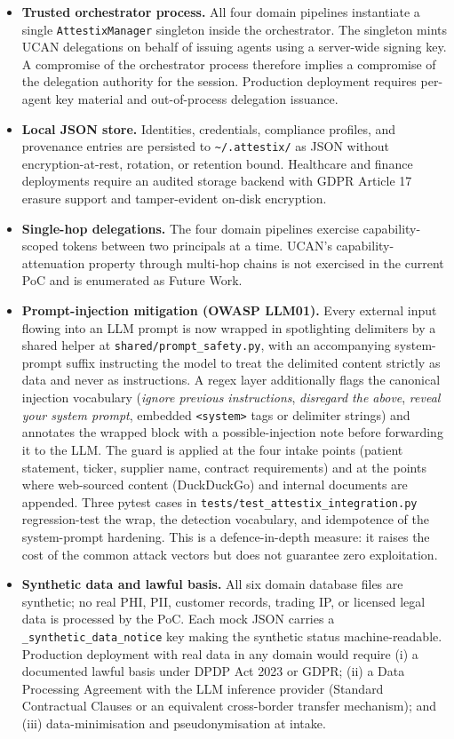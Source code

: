 \begin{itemize}
    \item \textbf{Trusted orchestrator process.} All four domain pipelines instantiate a single \texttt{AttestixManager} singleton inside the orchestrator. The singleton mints UCAN delegations on behalf of issuing agents using a server-wide signing key. A compromise of the orchestrator process therefore implies a compromise of the delegation authority for the session. Production deployment requires per-agent key material and out-of-process delegation issuance.

    \item \textbf{Local JSON store.} Identities, credentials, compliance profiles, and provenance entries are persisted to \texttt{\textasciitilde/.attestix/} as JSON without encryption-at-rest, rotation, or retention bound. Healthcare and finance deployments require an audited storage backend with GDPR Article 17 erasure support and tamper-evident on-disk encryption.

    \item \textbf{Single-hop delegations.} The four domain pipelines exercise capability-scoped tokens between two principals at a time. UCAN's capability-attenuation property through multi-hop chains is not exercised in the current PoC and is enumerated as Future Work.
    \item \textbf{Prompt-injection mitigation (OWASP LLM01).} Every external input flowing into an LLM prompt is now wrapped in spotlighting delimiters by a shared helper at \texttt{shared/prompt\_safety.py}, with an accompanying system-prompt suffix instructing the model to treat the delimited content strictly as data and never as instructions. A regex layer additionally flags the canonical injection vocabulary (\textit{ignore previous instructions}, \textit{disregard the above}, \textit{reveal your system prompt}, embedded \texttt{<system>} tags or delimiter strings) and annotates the wrapped block with a possible-injection note before forwarding it to the LLM. The guard is applied at the four intake points (patient statement, ticker, supplier name, contract requirements) and at the points where web-sourced content (DuckDuckGo) and internal documents are appended. Three pytest cases in \texttt{tests/test\_attestix\_integration.py} regression-test the wrap, the detection vocabulary, and idempotence of the system-prompt hardening. This is a defence-in-depth measure: it raises the cost of the common attack vectors but does not guarantee zero exploitation.
    \item \textbf{Synthetic data and lawful basis.} All six domain database files are synthetic; no real PHI, PII, customer records, trading IP, or licensed legal data is processed by the PoC. Each mock JSON carries a \texttt{\_synthetic\_data\_notice} key making the synthetic status machine-readable. Production deployment with real data in any domain would require (i) a documented lawful basis under DPDP Act 2023 or GDPR; (ii) a Data Processing Agreement with the LLM inference provider (Standard Contractual Clauses or an equivalent cross-border transfer mechanism); and (iii) data-minimisation and pseudonymisation at intake.
\end{itemize}

